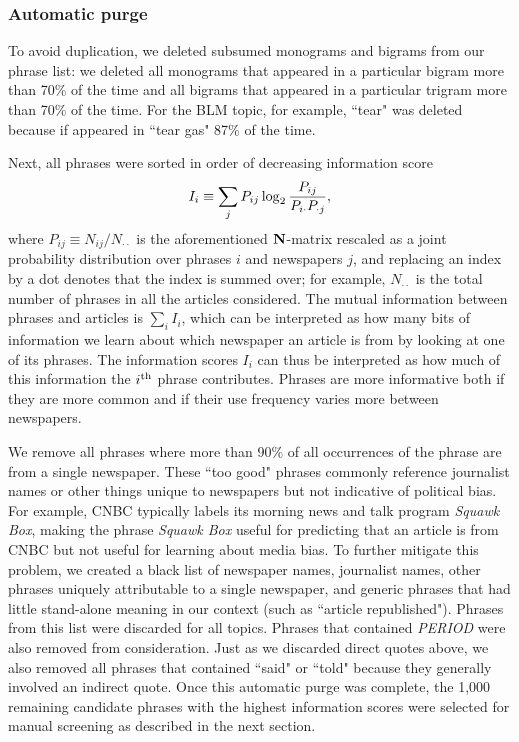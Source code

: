 \documentclass[10pt,letterpaper]{article}
\def\N{{\bf N}}
\def\ith{i^{\rm th}}
\def\beq#1{\begin{equation}\label{#1}}
\def\eeq{\end{equation}}
\begin{document}
\subsubsection*{Automatic purge}

To avoid duplication, we deleted subsumed monograms and bigrams from our phrase list:
we deleted all monograms that appeared in a particular bigram more than 70\% of the time and all bigrams that appeared in a particular trigram more than 70\% of the time. For the BLM topic, for example, ``tear" was deleted because if appeared in ``tear gas" 87\% of the time. 

Next, all phrases were sorted in order of decreasing information score
\beq{InfoScoreEq}
I_i\equiv\sum_j P_{ij}\log_2 {P_{ij}\over P_{i\cdot} P_{\cdot j}},
\eeq
where $P_{ij}\equiv N_{ij}/N_{\cdot\cdot}$ is the aforementioned $\N$-matrix rescaled as a joint probability distribution over phrases $i$ and newspapers $j$, and replacing an index by a dot denotes that the index is summed over; for example, 
$N_{\cdot\cdot}$ is the total number of phrases in all the articles considered.
The mutual information between phrases and articles is  $\sum_i I_i$, which can be interpreted as how many bits of information 
we learn about which newspaper an article is from by looking at one of its phrases.
The information scores $I_i$ can thus be interpreted as how much of this information the $\ith$ phrase contributes. Phrases are more informative both if they are more common and if their use frequency varies more between newspapers.

We remove all phrases where more than 90\% of all occurrences of the phrase are from a single newspaper.
These ``too good" phrases commonly reference journalist names or other things unique to newspapers but not indicative of political bias. For example, CNBC typically labels its morning news and talk program \textit{Squawk Box}, making the phrase \textit{Squawk Box} useful for predicting that an article is from CNBC but not useful for learning about media bias. 
To further mitigate this problem, we created a black list of newspaper names, journalist names, other phrases uniquely attributable to a single newspaper, and generic phrases that had little stand-alone meaning in our context (such as ``article republished"). Phrases from this list were discarded for all topics.
Phrases that contained \textit{PERIOD} were also removed from consideration. 
Just as we discarded direct quotes above, we also removed all phrases that contained ``said" or ``told"  because they generally involved an indirect quote. 
Once this automatic purge was complete, the 1,000 remaining candidate phrases with the highest information scores were selected for manual screening as  described in the next section. 
\end{document}

